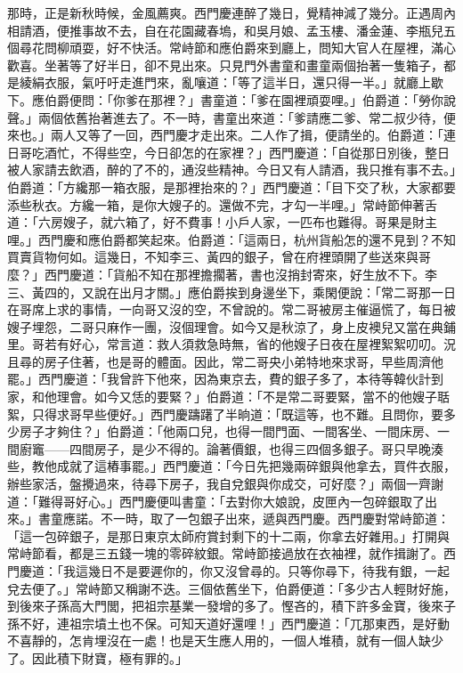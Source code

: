 那時，正是新秋時候，金風薦爽。西門慶連醉了幾日，覺精神減了幾分。正遇周內相請酒，便推事故不去，自在花園藏春塢，和吳月娘、孟玉樓、潘金蓮、李瓶兒五個尋花問柳頑耍，好不快活。常峙節和應伯爵來到廳上，問知大官人在屋裡，滿心歡喜。坐著等了好半日，卻不見出來。只見門外書童和畫童兩個抬著一隻箱子，都是綾絹衣服，氣吁吁走進門來，亂嚷道：「等了這半日，還只得一半。」就廳上歇下。應伯爵便問：「你爹在那裡？」書童道：「爹在園裡頑耍哩。」伯爵道：「勞你說聲。」兩個依舊抬著進去了。不一時，書童出來道：「爹請應二爹、常二叔少待，便來也。」兩人又等了一回，西門慶才走出來。二人作了揖，便請坐的。伯爵道：「連日哥吃酒忙，不得些空，今日卻怎的在家裡？」西門慶道：「自從那日別後，整日被人家請去飲酒，醉的了不的，通沒些精神。今日又有人請酒，我只推有事不去。」伯爵道：「方纔那一箱衣服，是那裡抬來的？」西門慶道：「目下交了秋，大家都要添些秋衣。方纔一箱，是你大嫂子的。還做不完，才勾一半哩。」常峙節伸著舌道：「六房嫂子，就六箱了，好不費事！小戶人家，一匹布也難得。哥果是財主哩。」西門慶和應伯爵都笑起來。伯爵道：「這兩日，杭州貨船怎的還不見到？不知買賣貨物何如。這幾日，不知李三、黃四的銀子，曾在府裡頭開了些送來與哥麼？」西門慶道：「貨船不知在那裡擔擱著，書也沒捎封寄來，好生放不下。李三、黃四的，又說在出月才關。」應伯爵挨到身邊坐下，乘閑便說：「常二哥那一日在哥席上求的事情，一向哥又沒的空，不曾說的。常二哥被房主催逼慌了，每日被嫂子埋怨，二哥只麻作一團，沒個理會。如今又是秋涼了，身上皮襖兒又當在典鋪里。哥若有好心，常言道：救人須救急時無，省的他嫂子日夜在屋裡絮絮叨叨。況且尋的房子住著，也是哥的體面。因此，常二哥央小弟特地來求哥，早些周濟他罷。」西門慶道：「我曾許下他來，因為東京去，費的銀子多了，本待等韓伙計到家，和他理會。如今又恁的要緊？」伯爵道：「不是常二哥要緊，當不的他嫂子聒絮，只得求哥早些便好。」西門慶躊躇了半晌道：「既這等，也不難。且問你，要多少房子才夠住？」伯爵道：「他兩口兒，也得一間門面、一間客坐、一間床房、一間廚竈——四間房子，是少不得的。論著價銀，也得三四個多銀子。哥只早晚湊些，教他成就了這樁事罷。」西門慶道：「今日先把幾兩碎銀與他拿去，買件衣服，辦些家活，盤攪過來，待尋下房子，我自兌銀與你成交，可好麼？」兩個一齊謝道：「難得哥好心。」西門慶便叫書童：「去對你大娘說，皮匣內一包碎銀取了出來。」書童應諾。不一時，取了一包銀子出來，遞與西門慶。西門慶對常峙節道：「這一包碎銀子，是那日東京太師府賞封剩下的十二兩，你拿去好雜用。」打開與常峙節看，都是三五錢一塊的零碎紋銀。常峙節接過放在衣袖裡，就作揖謝了。西門慶道：「我這幾日不是要遲你的，你又沒曾尋的。只等你尋下，待我有銀，一起兌去便了。」常峙節又稱謝不迭。三個依舊坐下，伯爵便道：「多少古人輕財好施，到後來子孫高大門閭，把祖宗基業一發增的多了。慳吝的，積下許多金寶，後來子孫不好，連祖宗墳土也不保。可知天道好還哩！」西門慶道：「兀那東西，是好動不喜靜的，怎肯埋沒在一處！也是天生應人用的，一個人堆積，就有一個人缺少了。因此積下財寶，極有罪的。」

